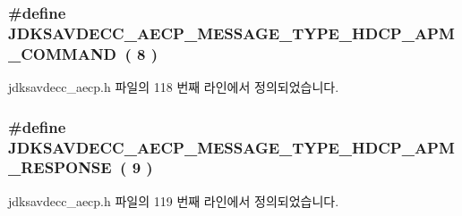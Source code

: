 \subsubsection[{\texorpdfstring{J\+D\+K\+S\+A\+V\+D\+E\+C\+C\+\_\+\+A\+E\+C\+P\+\_\+\+M\+E\+S\+S\+A\+G\+E\+\_\+\+T\+Y\+P\+E\+\_\+\+H\+D\+C\+P\+\_\+\+A\+P\+M\+\_\+\+C\+O\+M\+M\+A\+ND}{JDKSAVDECC_AECP_MESSAGE_TYPE_HDCP_APM_COMMAND}}]{\setlength{\rightskip}{0pt plus 5cm}\#define J\+D\+K\+S\+A\+V\+D\+E\+C\+C\+\_\+\+A\+E\+C\+P\+\_\+\+M\+E\+S\+S\+A\+G\+E\+\_\+\+T\+Y\+P\+E\+\_\+\+H\+D\+C\+P\+\_\+\+A\+P\+M\+\_\+\+C\+O\+M\+M\+A\+ND~( 8 )}\hypertarget{group__aecp__message__type_gad8bc8a9baa1622bd8eb8077cfc7683da}{}\label{group__aecp__message__type_gad8bc8a9baa1622bd8eb8077cfc7683da}


jdksavdecc\+\_\+aecp.\+h 파일의 118 번째 라인에서 정의되었습니다.

\subsubsection[{\texorpdfstring{J\+D\+K\+S\+A\+V\+D\+E\+C\+C\+\_\+\+A\+E\+C\+P\+\_\+\+M\+E\+S\+S\+A\+G\+E\+\_\+\+T\+Y\+P\+E\+\_\+\+H\+D\+C\+P\+\_\+\+A\+P\+M\+\_\+\+R\+E\+S\+P\+O\+N\+SE}{JDKSAVDECC_AECP_MESSAGE_TYPE_HDCP_APM_RESPONSE}}]{\setlength{\rightskip}{0pt plus 5cm}\#define J\+D\+K\+S\+A\+V\+D\+E\+C\+C\+\_\+\+A\+E\+C\+P\+\_\+\+M\+E\+S\+S\+A\+G\+E\+\_\+\+T\+Y\+P\+E\+\_\+\+H\+D\+C\+P\+\_\+\+A\+P\+M\+\_\+\+R\+E\+S\+P\+O\+N\+SE~( 9 )}\hypertarget{group__aecp__message__type_gabea02eb162583796abf33a90b4f7bc4f}{}\label{group__aecp__message__type_gabea02eb162583796abf33a90b4f7bc4f}


jdksavdecc\+\_\+aecp.\+h 파일의 119 번째 라인에서 정의되었습니다.

